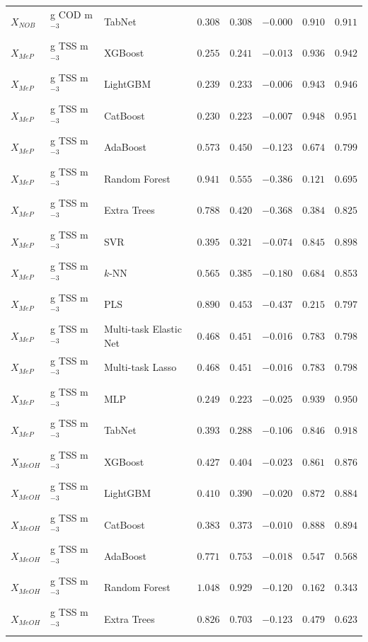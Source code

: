 \begin{longtable}{llp{3.1cm}rrrrr}
$X_{NOB}$ & g COD m$^{-3}$ & TabNet & $0.308$ & $0.308$ & $-0.000$ & $0.910$ & $0.911$ \\
$X_{MeP}$ & g TSS m$^{-3}$ & XGBoost & $0.255$ & $0.241$ & $-0.013$ & $0.936$ & $0.942$ \\
$X_{MeP}$ & g TSS m$^{-3}$ & LightGBM & $0.239$ & $0.233$ & $-0.006$ & $0.943$ & $0.946$ \\
$X_{MeP}$ & g TSS m$^{-3}$ & CatBoost & $0.230$ & $0.223$ & $-0.007$ & $0.948$ & $0.951$ \\
$X_{MeP}$ & g TSS m$^{-3}$ & AdaBoost & $0.573$ & $0.450$ & $-0.123$ & $0.674$ & $0.799$ \\
$X_{MeP}$ & g TSS m$^{-3}$ & Random Forest & $0.941$ & $0.555$ & $-0.386$ & $0.121$ & $0.695$ \\
$X_{MeP}$ & g TSS m$^{-3}$ & Extra Trees & $0.788$ & $0.420$ & $-0.368$ & $0.384$ & $0.825$ \\
$X_{MeP}$ & g TSS m$^{-3}$ & SVR & $0.395$ & $0.321$ & $-0.074$ & $0.845$ & $0.898$ \\
$X_{MeP}$ & g TSS m$^{-3}$ & $k$-NN & $0.565$ & $0.385$ & $-0.180$ & $0.684$ & $0.853$ \\
$X_{MeP}$ & g TSS m$^{-3}$ & PLS & $0.890$ & $0.453$ & $-0.437$ & $0.215$ & $0.797$ \\
$X_{MeP}$ & g TSS m$^{-3}$ & Multi-task Elastic Net & $0.468$ & $0.451$ & $-0.016$ & $0.783$ & $0.798$ \\
$X_{MeP}$ & g TSS m$^{-3}$ & Multi-task Lasso & $0.468$ & $0.451$ & $-0.016$ & $0.783$ & $0.798$ \\
$X_{MeP}$ & g TSS m$^{-3}$ & MLP & $0.249$ & $0.223$ & $-0.025$ & $0.939$ & $0.950$ \\
$X_{MeP}$ & g TSS m$^{-3}$ & TabNet & $0.393$ & $0.288$ & $-0.106$ & $0.846$ & $0.918$ \\
$X_{MeOH}$ & g TSS m$^{-3}$ & XGBoost & $0.427$ & $0.404$ & $-0.023$ & $0.861$ & $0.876$ \\
$X_{MeOH}$ & g TSS m$^{-3}$ & LightGBM & $0.410$ & $0.390$ & $-0.020$ & $0.872$ & $0.884$ \\
$X_{MeOH}$ & g TSS m$^{-3}$ & CatBoost & $0.383$ & $0.373$ & $-0.010$ & $0.888$ & $0.894$ \\
$X_{MeOH}$ & g TSS m$^{-3}$ & AdaBoost & $0.771$ & $0.753$ & $-0.018$ & $0.547$ & $0.568$ \\
$X_{MeOH}$ & g TSS m$^{-3}$ & Random Forest & $1.048$ & $0.929$ & $-0.120$ & $0.162$ & $0.343$ \\
$X_{MeOH}$ & g TSS m$^{-3}$ & Extra Trees & $0.826$ & $0.703$ & $-0.123$ & $0.479$ & $0.623$ \\

\end{longtable}
